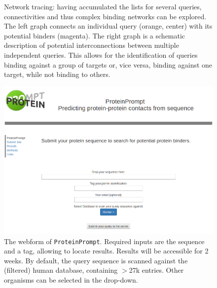\documentclass{article}
\newcommand{\tool}{\texttt{ProteinPrompt}}
\begin{document}
\begin{figure}
  
  \caption{Network tracing: having accumulated the lists for several queries, connectivities and thus complex binding networks can be explored.
   The left graph connects an individual query (orange, center) with its potential binders (magenta).
   The right graph is a schematic description of potential interconnections between multiple independent queries.
   This allows for the identification of queries binding against a group of targets or, vice versa, binding against one target, while not binding to others.
  }
  \label{fig:connect}
\end{figure}

\begin{figure}
  \hspace{-1.5cm}\includegraphics[width=1.2\linewidth]{material/webform.png}
  \caption{ The webform of \tool.
    Required inputs are the sequence and a tag, allowing to locate results.
    Results will be accessible for 2 weeks.
    By default, the query sequence is scanned against the (filtered) human database, containing $>$27k entries.
    Other organisms can be selected in the drop-down.}
  \label{fig:webform}
\end{figure}





\end{document}
